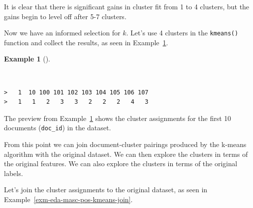 \documentclass[
  letterpaper,
  DIV=11,
  numbers=noendperiod]{scrreprt}
\newenvironment{Shaded}{\begin{snugshade}}{\end{snugshade}}
\newcommand{\AttributeTok}[1]{\textcolor[rgb]{0.00,0.00,0.00}{#1}}
\newcommand{\CommentTok}[1]{\textcolor[rgb]{0.00,0.00,0.00}{\textit{#1}}}
\newcommand{\DecValTok}[1]{\textcolor[rgb]{0.00,0.00,0.00}{#1}}
\newcommand{\FunctionTok}[1]{\textcolor[rgb]{0.00,0.00,0.00}{#1}}
\newcommand{\NormalTok}[1]{\textcolor[rgb]{0.00,0.00,0.00}{#1}}
\newcommand{\OtherTok}[1]{\textcolor[rgb]{0.00,0.00,0.00}{#1}}
\newcommand{\SpecialCharTok}[1]{\textcolor[rgb]{0.00,0.00,0.00}{#1}}
\theoremstyle{definition}
\newtheorem{example}{Example}[chapter]
\theoremstyle{remark}
\begin{document}
It is clear that there is significant gains in cluster fit from 1 to 4
clusters, but the gains begin to level off after 5-7 clusters.

Now we have an informed selection for \(k\). Let's use 4 clusters in the
\texttt{kmeans()} function and collect the results, as seen in
Example~\ref{exm-eda-masc-pos-kmeans-fit}.

\begin{example}[]\protect\hypertarget{exm-eda-masc-pos-kmeans-fit}{}\label{exm-eda-masc-pos-kmeans-fit}

~

\begin{Shaded}
\end{Shaded}

\begin{verbatim}
>   1  10 100 101 102 103 104 105 106 107 
>   1   1   2   3   3   2   2   2   4   3
\end{verbatim}

\end{example}

The preview from Example~\ref{exm-eda-masc-pos-kmeans-fit} shows the
cluster assignments for the first 10 documents (\texttt{doc\_id}) in the
dataset.

From this point we can join document-cluster pairings produced by the
k-means algorithm with the original dataset. We can then explore the
clusters in terms of the original features. We can also explore the
clusters in terms of the original labels.

Let's join the cluster assignments to the original dataset, as seen in
Example~\ref{exm-eda-masc-pos-kmeans-join}.
\end{document}
